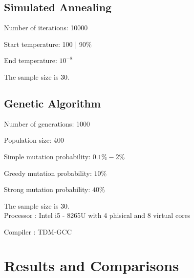 \documentclass[12pt,leqno]{article}
\begin{document}
  \subsection*{Simulated Annealing}
  Number of iterations: 10000
  
  Start temperature: 100 | 90\% 
  
  End temperature: $10^{-8}$ 

  The sample size is 30.
  \subsection*{Genetic Algorithm}
  
  Number of generations: 1000
  
  Population size: 400
  
  Simple mutation probability: $0.1\% - 2\%$
  
  Greedy mutation probability: $10\%$

  Strong mutation probability: $40\%$
  
  The sample size is 30. \\


  Processor : Intel i5 - 8265U with 4 phisical and 8 virtual cores

  Compiler : TDM-GCC

\section{Results and Comparisons}
\end{document}
